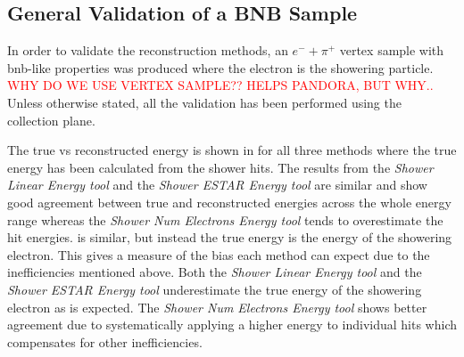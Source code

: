 \subsection{General Validation of a BNB Sample}

In order to validate the reconstruction methods, an $e^- + \pi^+$ vertex sample with \gls{bnb}-like properties was produced where the electron is the showering particle. \textcolor{red}{WHY DO WE USE VERTEX SAMPLE?? HELPS PANDORA, BUT WHY..} Unless otherwise stated, all the validation has been performed using the collection plane. 

The true vs reconstructed energy is shown in  for all three methods where the true energy has been calculated from the shower hits. The results from the \textit{Shower Linear Energy tool} and the \textit{Shower ESTAR Energy tool} are similar and show good agreement between true and reconstructed energies across the whole energy range whereas the \textit{Shower Num Electrons Energy tool} tends to overestimate the hit energies.  is similar, but instead the true energy is the energy of the showering electron. This gives a measure of the bias each method can expect due to the inefficiencies mentioned above. Both the \textit{Shower Linear Energy tool} and the \textit{Shower ESTAR Energy tool} underestimate the true energy of the showering electron as is expected. The \textit{Shower Num Electrons Energy tool} shows better agreement due to systematically applying a higher energy to individual hits which compensates for other inefficiencies. 

